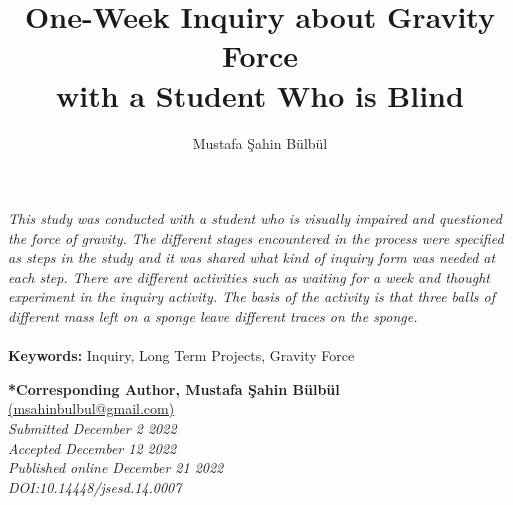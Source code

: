 \documentclass[11.5pt]{sig-alternate}
\makeatletter
\let\oldabstract\abstract
\let\oldendabstract\endabstract
\renewenvironment{abstract}
{\renewenvironment{quotation}%
               {\list{}{\addtolength{\leftmargin}{1em} %
                        \listparindent 1.5em%
                        \itemindent    \listparindent%
                        \rightmargin   \leftmargin%
                        \parsep        \z@ \@plus\p@}%
                \item\relax}%
               {\endlist}%
\oldabstract}
{\oldendabstract}
\makeatother
\begin{document}
\title{One-Week Inquiry about Gravity Force \\with a Student Who is Blind}

\author[1]{\large \color{blue}Mustafa Şahin Bülbül}


\toappear{}

\maketitle
\begin{@twocolumnfalse} 
\begin{abstract}
\begin{large}
\item 
 \textit {This study was conducted with a student who is visually impaired and questioned the force of gravity. The different stages encountered in the process were specified as steps in the study and it was shared what kind of inquiry form was needed at each step. There are different activities such as waiting for a week and thought experiment in the inquiry activity. The basis of the activity is that three balls of different mass left on a sponge leave different traces on the sponge.}
     \\
     \\
     \textbf{Keywords:} Inquiry, Long Term Projects, Gravity Force
\end{large}
\end{abstract}
\end{@twocolumnfalse}




\textbf{*Corresponding Author, Mustafa Şahin Bülbül }\\
\href{mailto: msahinbulbul@gmail.com }{(msahinbulbul@gmail.com)} \\
\textit{Submitted December 2 2022 }\\
\textit{Accepted December 12 2022} \\
\textit{Published online December 21 2022} \\
\textit{DOI:10.14448/jsesd.14.0007} \\


\pagebreak
\pagebreak

\vspace{5mm}
\end{document}
